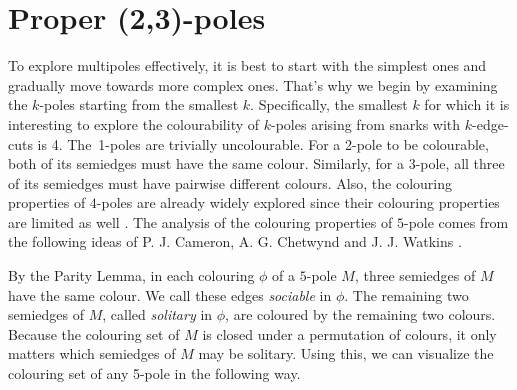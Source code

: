 \section{Proper (2,3)-poles}\label{ch:proper-23-poles}

To explore multipoles effectively, it is best to start with the simplest ones and gradually move towards more complex ones. That's why we begin by examining the $k$-poles starting from the smallest $k$. Specifically, the smallest $k$ for which it is interesting to explore the colourability of $k$-poles arising from snarks with $k$-edge-cuts is 4.
The~1-poles are trivially uncolourable.
For a 2-pole to be colourable, both of its semiedges must have the same colour.
Similarly, for a 3-pole, all three of its semiedges must have pairwise different colours. Also, the colouring properties of $4$-poles are already widely explored since their colouring properties are limited as well \cite{ChladnyFactorisation}.
The analysis of the colouring properties of $5$-pole comes from the following ideas of P. J. Cameron, A. G. Chetwynd and J. J. Watkins \cite{Cameron1987}.

By the Parity Lemma, in each colouring $\phi$ of a $5$-pole $M$, three semiedges of $M$ have the same colour. We call these edges \textit{sociable} in $\phi$. The remaining two semiedges of $M$, called \emph{solitary} in $\phi$, are coloured by the remaining two colours.
Because the colouring set of $M$ is closed under a permutation of colours, it only matters which semiedges of $M$ may be solitary. Using this, we can visualize the colouring set of any 5-pole in the following way.


